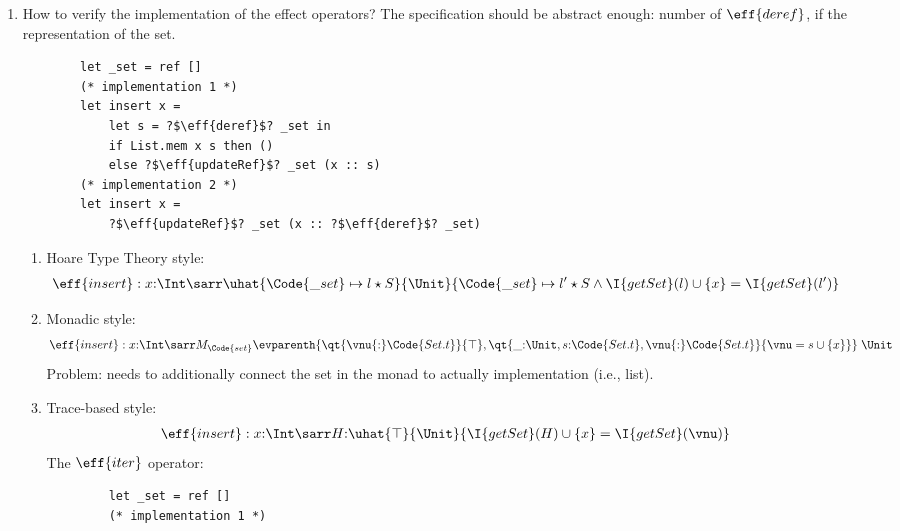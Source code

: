 \begin{example}[Iterators]
\begin{enumerate}
\begin{verbatim}
        let iter f =
            let s = ?$\eff{deref}$? _set in
            let rec loop s =
                match s with
                | [] -> ()
                | x :: xs -> f x; loop xs in
            loop s
        \end{verbatim}
        \item How to verify the implementation of the effect operators? The specification should be abstract enough: number of $\eff{deref}$, if the representation of the set.
        \begin{verbatim}
        let _set = ref []
        (* implementation 1 *)
        let insert x =
            let s = ?$\eff{deref}$? _set in
            if List.mem x s then ()
            else ?$\eff{updateRef}$? _set (x :: s)
        (* implementation 2 *)
        let insert x =
            ?$\eff{updateRef}$? _set (x :: ?$\eff{deref}$? _set)
        \end{verbatim}
        \begin{enumerate}
        \item Hoare Type Theory style:
        \begin{align*}
            & \eff{insert}: x{:}\Int \sarr 
            \uhat{\Code{\_set} \mapsto l \star S}{\Unit}{\Code{\_set} \mapsto l' \star S \land \I{getSet}(l) \cup \{x\} = \I{getSet}(l') } 
        \end{align*}
        \item Monadic style:
        \begin{align*}
            & \eff{insert}: x{:}\Int \sarr M_{\Code{set}}\evparenth{\qt{\vnu{:}\Code{Set.t}}{\top}, \qt{\_{:}\Unit,s{:}\Code{Set.t},\vnu{:}\Code{Set.t}}{\vnu = s \cup \{x\}}} \;\Unit
        \end{align*}\noindent Problem: needs to additionally connect the set in the monad to actually implementation (i.e., list).
        \item Trace-based style:
        \begin{align*}
            & \eff{insert}: x{:}\Int \sarr H{:}\uhat{\top}{\Unit}{\I{getSet}(H) \cup \{x\} = \I{getSet}(\vnu)}
        \end{align*}
        The $\eff{iter}$ operator:
        \end{enumerate}
        \begin{verbatim}
            let _set = ref []
            (* implementation 1 *)

\end{verbatim}
\end{enumerate}
\end{example}
